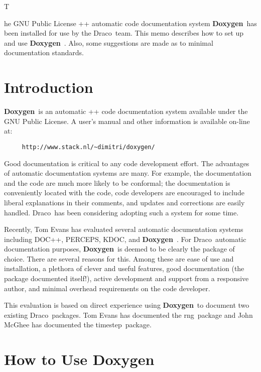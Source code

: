 \documentclass[11pt]{nmemo}
\newcommand{\draco}{{\normalfont\sffamily Draco}}
\newcommand{\doxy}{{\normalfont\bfseries Doxygen}}
\newcommand{\rng}{{\normalfont\sffamily rng}}
\newcommand{\timestep}{{\normalfont\sffamily timestep}}
\begin{document}
\opening

The GNU Public License \C++ automatic code documentation system \doxy\ 
has been installed for use by the \draco\ team. This memo describes
how to set up and use \doxy\ .  Also, some suggestions are made as to
minimal documentation standards.


\section{Introduction}

\doxy\ is an automatic \C++ code documentation system available under
the GNU Public License.  A user's manual and other information is
available on-line at:
\begin{verbatim} 
     http://www.stack.nl/~dimitri/doxygen/ 
\end{verbatim}

Good documentation is critical to any code development effort.  The
advantages of automatic documentation systems are many.  For example,
the documentation and the code are much more likely to be conformal;
the documentation is conveniently located with the code, code
developers are encouraged to include liberal explanations in their
comments, and updates and corrections are easily handled.  \draco\ has
been considering adopting such a system for some time.


Recently, Tom Evans has evaluated several automatic documentation
systems including DOC++, PERCEPS, KDOC, and \doxy\ .  For \draco\ 
automatic documentation purposes, \doxy\ is deemed to be clearly the
package of choice. There are several reasons for this. Among these are
ease of use and installation, a plethora of clever and useful
features, good documentation (the package documented itself!), active
development and support from a responsive author, and minimal overhead
requirements on the code developer.


This evaluation is based on direct experience using \doxy\ to document
two existing \draco\ packages.  Tom Evans has documented the \rng\ package and
John McGhee has documented the \timestep\ package.  


\section{How to Use \doxy\ }
\end{document}
